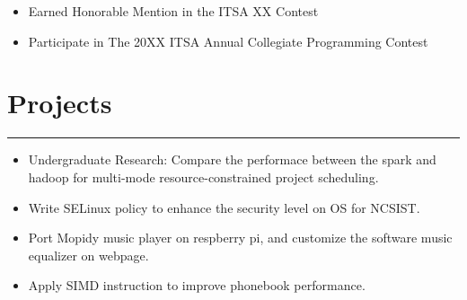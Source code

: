 \documentclass[12pt]{article}
\begin{document}
	\begin{itemize}
		\item Earned Honorable Mention in the ITSA XX Contest
		\item Participate in The 20XX ITSA Annual Collegiate Programming Contest
		
	\end{itemize}
		

	\section*{Projects}
	\nointerlineskip
	\noindent\rule{450pt}{0.4pt}
	\begin{itemize}
	\item Undergraduate Research: Compare the performace  between the spark and hadoop for multi-mode resource-constrained project scheduling.
	\item Write SELinux policy to enhance the security level on OS for NCSIST.
	\item Port Mopidy music player on respberry pi, and customize the software music equalizer on webpage.
	\item Apply SIMD instruction to improve phonebook performance.
	\end{itemize}

	
\end{document}
